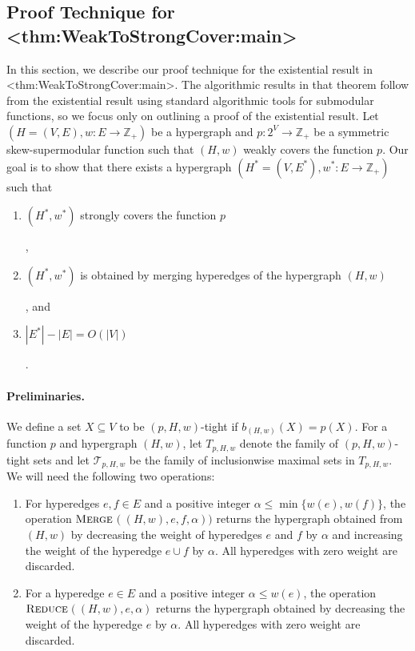 \documentclass{article}
\def\Cref#1{<#1>}%
\newcommand{\merge}{\ensuremath{\textsc{Merge}}\xspace}
\newcommand{\reduce}{\ensuremath{\textsc{Reduce}}\xspace}
\providecommand{\Z}{\mathbb{Z}}
\begin{document}
\subsection{Proof Technique for \Cref{thm:WeakToStrongCover:main}}
In this section, we describe our proof technique for the existential result in \Cref{thm:WeakToStrongCover:main}. 
The algorithmic results in that theorem follow from the existential result using standard algorithmic tools for submodular functions, so we focus only on outlining a proof of the existential result. 
Let $(H=(V, E), w: E\rightarrow \Z_+)$ be a hypergraph and $p: 2^V\rightarrow \Z_+$ be a symmetric skew-supermodular function such that $(H, w)$ weakly covers the function $p$. Our goal is to show that there exists a hypergraph $(H^*=(V, E^*), w^*: E\rightarrow \Z_+)$ such that 
\begin{enumerate}[label=(\arabic*)]
    \item \hypertarget{WeakToStrong(1)}{$(H^*, w^*)$ strongly covers the function $p$},
    \item \hypertarget{WeakToStrong(2)}{$(H^*, w^*)$ is obtained by merging hyperedges of the hypergraph $(H, w)$}, and
    \item \hypertarget{WeakToStrong(3)}{$|E^*|-|E|=O(|V|)$}. 
\end{enumerate}

\paragraph{Preliminaries.} We define a set $X\subseteq V$ to be $(p, H, w)$-tight if $b_{(H, w)}(X) = p(X)$. For a function $p$ and hypergraph $(H, w)$, let $T_{p, H, w}$ denote the family of $(p,H, w)$-tight sets and let $\mathcal{T}_{p, H, w}$ be the family of inclusionwise maximal sets in $T_{p, H, w}$. We will need the following two operations: 
\begin{enumerate}[label=(\roman*)]
    \item For hyperedges $e, f\in E$ and a positive integer  $\alpha \le \min\{w(e), w(f)\}$, the operation \merge$((H, w), e, f, \alpha))$ returns the hypergraph obtained from $(H, w)$ by decreasing the weight of hyperedges $e$ and $f$ by $\alpha$ and increasing the weight of the hyperedge $e\cup f$ by $\alpha$. All hyperedges with zero weight are discarded.
    \item For a hyperedge $e\in E$ and a positive integer $\alpha\le w(e)$, the operation \reduce$((H, w), e, \alpha)$ returns the hypergraph obtained by decreasing the weight of the hyperedge $e$ by $\alpha$. All hyperedges with zero weight are discarded.
\end{enumerate}
 
\end{document}
